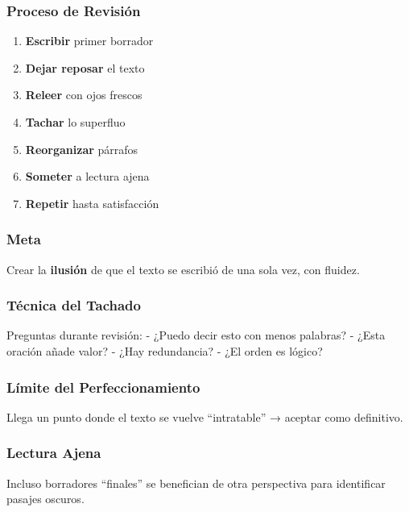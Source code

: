 \documentclass[
  11pt,
]{beaner}
\providecommand{\tightlist}{%
  \setlength{\itemsep}{0pt}\setlength{\parskip}{0pt}}
\begin{document}
\subsubsection{Proceso de Revisión}\label{proceso-de-revisiuxf3n}

\begin{enumerate}
\def\labelenumi{\arabic{enumi}.}
\tightlist
\item
  \textbf{Escribir} primer borrador
\item
  \textbf{Dejar reposar} el texto
\item
  \textbf{Releer} con ojos frescos
\item
  \textbf{Tachar} lo superfluo
\item
  \textbf{Reorganizar} párrafos
\item
  \textbf{Someter} a lectura ajena
\item
  \textbf{Repetir} hasta satisfacción
\end{enumerate}

\subsubsection{Meta}\label{meta-1}

Crear la \textbf{ilusión} de que el texto se escribió de una sola vez,
con fluidez.

\subsubsection{Técnica del Tachado}\label{tuxe9cnica-del-tachado}

Preguntas durante revisión: - ¿Puedo decir esto con menos palabras? -
¿Esta oración añade valor? - ¿Hay redundancia? - ¿El orden es lógico?

\subsubsection{Límite del
Perfeccionamiento}\label{luxedmite-del-perfeccionamiento}

Llega un punto donde el texto se vuelve ``intratable'' → aceptar como
definitivo.

\subsubsection{Lectura Ajena}\label{lectura-ajena}

\begin{tcolorbox}[enhanced jigsaw, arc=.35mm, rightrule=.15mm, breakable, titlerule=0mm, title=\textcolor{quarto-callout-tip-color}{\faLightbulb}\hspace{0.5em}{Consejo de Oro}, toprule=.15mm, left=2mm, colback=white, colbacktitle=quarto-callout-tip-color!10!white, bottomrule=.15mm, colframe=quarto-callout-tip-color-frame, toptitle=1mm, opacityback=0, opacitybacktitle=0.6, coltitle=black, bottomtitle=1mm, leftrule=.75mm]

Incluso borradores ``finales'' se benefician de otra perspectiva para
identificar pasajes oscuros.

\end{tcolorbox}
\end{document}

